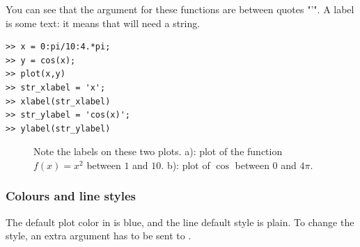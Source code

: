		You can see that the argument for these functions are between quotes "'".
		A label is some text: it means that \matlab will need a string.
\begin{lstlisting}
>> x = 0:pi/10:4.*pi;
>> y = cos(x);
>> plot(x,y)
>> str_xlabel = 'x';
>> xlabel(str_xlabel)
>> str_ylabel = 'cos(x)';
>> ylabel(str_ylabel)
\end{lstlisting}
		\begin{figure}
			\center
			\caption{
				Note the labels on these two plots.
				a): plot of the function $f(x) = x^2$ between $1$ and $10$.
				b): plot of $\cos$ between $0$ and $4\pi$.
				}
			\label{fig-labels}
		\end{figure}	
		\subsubsection{Colours and line styles}
			The default plot color in \matlab is blue, and the line default style is plain.
			To change the style, an extra argument has to be sent to \matlab.
			
